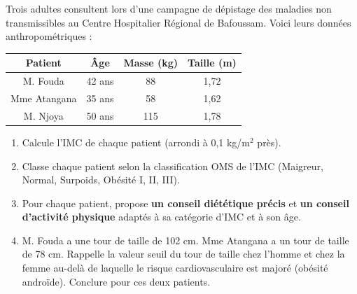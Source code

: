 \documentclass[11pt]{article}
\begin{document}
\begin{exercice}
Trois adultes consultent lors d'une campagne de dépistage des maladies non transmissibles au Centre Hospitalier Régional de Bafoussam. Voici leurs données anthropométriques :
\begin{center}
\begin{tabular}{|c|c|c|c|}\hline
\textbf{Patient} & \textbf{Âge} & \textbf{Masse (kg)} & \textbf{Taille (m)} \\ \hline
M. Fouda & 42 ans & 88 & 1,72 \\ \hline
Mme Atangana & 35 ans & 58 & 1,62 \\ \hline
M. Njoya & 50 ans & 115 & 1,78 \\ \hline
\end{tabular}
\end{center}
\begin{enumerate}
    \item Calcule l'IMC de chaque patient (arrondi à 0,1 kg/m$^2$ près).
    \item Classe chaque patient selon la classification OMS de l'IMC (Maigreur, Normal, Surpoids, Obésité I, II, III).
    \item Pour chaque patient, propose \textbf{un conseil diététique précis} et \textbf{un conseil d'activité physique} adaptés à sa catégorie d'IMC et à son âge.
    \item M. Fouda a une tour de taille de 102 cm. Mme Atangana a un tour de taille de 78 cm. Rappelle la valeur seuil du tour de taille chez l'homme et chez la femme au-delà de laquelle le risque cardiovasculaire est majoré (obésité androïde). Conclure pour ces deux patients.
\end{enumerate}
\end{exercice}
\end{document}
